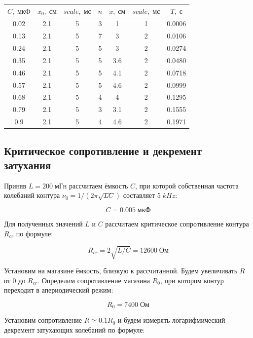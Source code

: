 \documentclass[11pt]{article}
\begin{document}
\begin{table}[H]
    \centering
    \label{table:T}
    \begin{tabular}{|c|c|c|c|c|c|c|}
    \hline
    \(C,\; мкФ \) & \(x_0,\; см\) & \(scale,\; мс\) & \(n\) & \(x,\; см\) & \(scale,\; мс\)& \(T,\; с\) \\\hline
    0.02   & 2.1    & 5         & 3 & 1     & 1         & 0.0006 \\\hline
    0.13   & 2.1    & 5         & 7 & 3     & 2         & 0.0106 \\\hline
    0.24   & 2.1    & 5         & 5 & 3     & 2         & 0.0274 \\\hline
    0.35   & 2.1    & 5         & 5 & 3.6   & 2         & 0.0480 \\\hline
    0.46   & 2.1    & 5         & 5 & 4.1   & 2         & 0.0718 \\\hline
    0.57   & 2.1    & 5         & 5 & 4.6   & 2         & 0.0999 \\\hline
    0.68   & 2.1    & 5         & 4 & 4     & 2         & 0.1295 \\\hline
    0.79   & 2.1    & 5         & 3 & 3.1   & 2         & 0.1555 \\\hline
    0.9    & 2.1    & 5         & 4 & 4.6   & 2         & 0.1971 \\\hline
    \end{tabular}
\end{table}

\subsection{Критическое сопротивление и декремент затухания} \label{sec:Rcr}
Приняв \( L = 200\; мГн \) рассчитаем ёмкость \( C \), при которой собственная частота колебаний контура 
\( \nu_0 = 1/(2\pi\sqrt{LC}) \) составляет \( 5\; kHz \):

\[ C = 0.005\; мкФ \]

Для полученных значений \( L \) и \( C \) рассчитаем критическое сопротивление контура \( R_{cr} \) по формуле:

\[ R_{cr} = 2\sqrt{L/C} = 12600\; Ом \]

Установим на магазине ёмкость, близкую к рассчитанной. Будем увеличивать \( R \) от \( 0 \) до \( R_{cr} \). Определим
сопротивление магазина \( R_0 \), при котором контур переходит в апериодический режим:

\[ R_0 = 7400\; Ом \]

Установим сопротивление \( R \simeq 0.1R_0 \) и будем измерять логарифмический декремент затухающих колебаний
по формуле:
\end{document}
